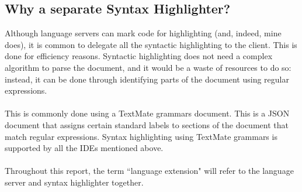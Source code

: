 \documentclass[../main.tex]{subfiles}
\begin{document}
\subsection{Why a separate Syntax Highlighter?}
Although language servers can mark code for highlighting (and, indeed, mine does), it is common to delegate all the syntactic highlighting to the client. This is done for efficiency reasons. Syntactic highlighting does not need a complex algorithm to parse the document, and it would be a waste of resources to do so: instead, it can be done through identifying parts of the document using regular expressions. 
\\ 
\\
This is commonly done using a TextMate grammars \cite{textmate_grammars_spec} document. This is a JSON document that assigns certain standard labels to sections of the document that match regular expressions. Syntax highlighting using TextMate grammars is supported by all the IDEs mentioned above.
\\ 
\\
Throughout this report, the term ``language extension" will refer to the language server and syntax highlighter together.
\end{document}
